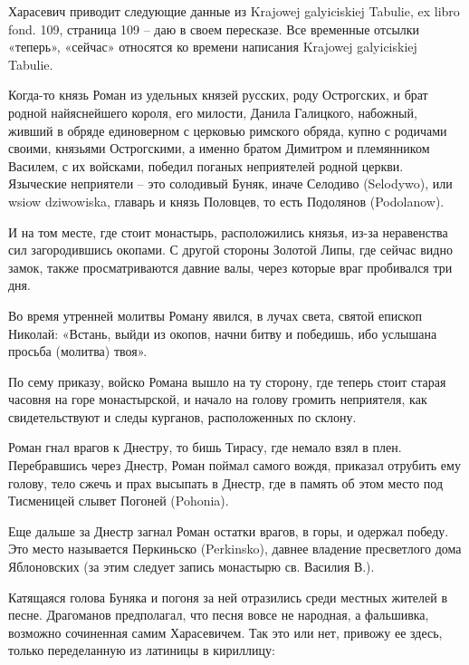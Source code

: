 Харасевич приводит следующие данные из Krajowej galyiciskiej Tabulie, ex libro fond. 109, страница 109 – даю в своем пересказе. Все временные отсылки «теперь», «сейчас» относятся ко времени написания Krajowej galyi\-ciskiej Tabulie.

Когда-то князь Роман из удельных князей русских, роду Острогских, и брат родной найяснейшего короля, его милости, Данила Галицкого, набожный, живший в обряде единоверном с церковью римского обряда, купно с родичами своими, князьями Острогскими, а именно братом Димитром и племянником Василем, с их войсками, победил поганых неприятелей родной церкви. Языческие неприятели – это солодивый Буняк, иначе Селодиво (Selodywo), или wsiow dziwowiska, главарь и князь Половцев, то есть Подолянов (Podolanow).

И на том месте, где стоит монастырь, расположились князья, из-за неравенства сил загородившись окопами. С другой стороны Золотой Липы, где сейчас видно замок, также просматриваются давние валы, через которые враг пробивался три дня.

Во время утренней молитвы Роману явился, в лучах света, святой епископ Николай: «Встань, выйди из окопов, начни битву и победишь, ибо услышана просьба (молитва) твоя».

По сему приказу, войско Романа вышло на ту сторону, где теперь стоит старая часовня на горе монастырской, и начало на голову громить неприятеля, как свидетельствуют и следы курганов, расположенных по склону.

Роман гнал врагов к Днестру, то бишь Тирасу, где немало взял в плен. Перебравшись через Днестр, Роман поймал самого вождя, приказал отрубить ему голову, тело сжечь и прах высыпать в Днестр, где в память об этом место под Тисменицей слывет Погоней (Pohonia).

Еще дальше за Днестр загнал Роман остатки врагов, в горы, и одержал победу. Это место называется Перкиньско (Perkinsko), давнее владение пресветлого дома Яблоновских (за этим следует запись монастырю св. Василия В.).

Катящаяся голова Буняка и погоня за ней отразились среди местных жителей в песне. Драгоманов предполагал, что песня вовсе не народная, а фальшивка, возможно сочиненная самим Харасевичем. Так это или нет, привожу ее здесь, только переделанную из латиницы в кириллицу:

